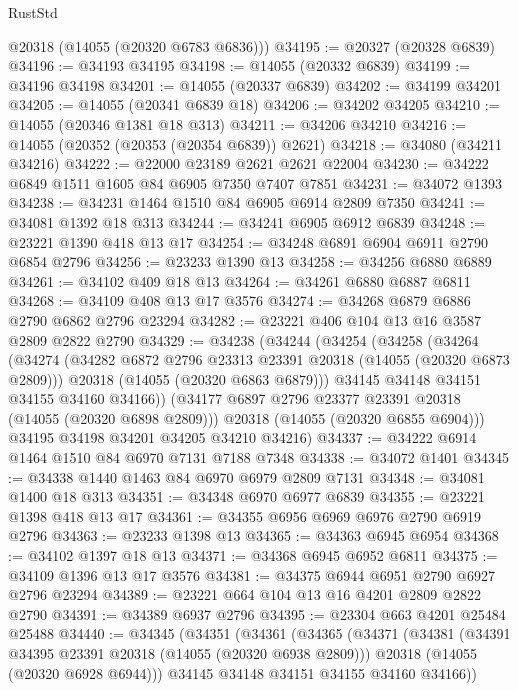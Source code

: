 \begin{lexlean}{RustStd}
\begin{coremodule}
      @20318
      (@14055 (@20320 @6783 @6836)))
@34195 := @20327 (@20328 @6839)
@34196 := @34193 @34195
@34198 := @14055 (@20332 @6839)
@34199 := @34196 @34198
@34201 := @14055 (@20337 @6839)
@34202 := @34199 @34201
@34205 := @14055 (@20341 @6839 @18)
@34206 := @34202 @34205
@34210 := @14055 (@20346 @1381 @18 @313)
@34211 := @34206 @34210
@34216 := @14055 (@20352 (@20353 (@20354 @6839)) @2621)
@34218 := @34080 (@34211 @34216)
@34222 := @22000 @23189 @2621 @2621 @22004
@34230 := @34222 @6849 @1511 @1605 @84 @6905 @7350 @7407 @7851
@34231 := @34072 @1393
@34238 := @34231 @1464 @1510 @84 @6905 @6914 @2809 @7350
@34241 := @34081 @1392 @18 @313
@34244 := @34241 @6905 @6912 @6839
@34248 := @23221 @1390 @418 @13 @17
@34254 := @34248 @6891 @6904 @6911 @2790 @6854 @2796
@34256 := @23233 @1390 @13
@34258 := @34256 @6880 @6889
@34261 := @34102 @409 @18 @13
@34264 := @34261 @6880 @6887 @6811
@34268 := @34109 @408 @13 @17 @3576
@34274 := @34268 @6879 @6886 @2790 @6862 @2796 @23294
@34282 := @23221 @406 @104 @13 @16 @3587 @2809 @2822 @2790
@34329 := @34238
    (@34244
      (@34254
        (@34258
          (@34264
            (@34274
              (@34282 @6872 @2796 @23313 @23391 @20318 (@14055 (@20320 @6873 @2809)))
              @20318
              (@14055 (@20320 @6863 @6879)))
            @34145
            @34148
            @34151
            @34155
            @34160
            @34166))
        (@34177 @6897 @2796 @23377 @23391 @20318 (@14055 (@20320 @6898 @2809)))
        @20318
        (@14055 (@20320 @6855 @6904)))
      @34195
      @34198
      @34201
      @34205
      @34210
      @34216)
@34337 := @34222 @6914 @1464 @1510 @84 @6970 @7131 @7188 @7348
@34338 := @34072 @1401
@34345 := @34338 @1440 @1463 @84 @6970 @6979 @2809 @7131
@34348 := @34081 @1400 @18 @313
@34351 := @34348 @6970 @6977 @6839
@34355 := @23221 @1398 @418 @13 @17
@34361 := @34355 @6956 @6969 @6976 @2790 @6919 @2796
@34363 := @23233 @1398 @13
@34365 := @34363 @6945 @6954
@34368 := @34102 @1397 @18 @13
@34371 := @34368 @6945 @6952 @6811
@34375 := @34109 @1396 @13 @17 @3576
@34381 := @34375 @6944 @6951 @2790 @6927 @2796 @23294
@34389 := @23221 @664 @104 @13 @16 @4201 @2809 @2822 @2790
@34391 := @34389 @6937 @2796
@34395 := @23304 @663 @4201 @25484 @25488
@34440 := @34345
    (@34351
      (@34361
        (@34365
          (@34371
            (@34381
              (@34391 @34395 @23391 @20318 (@14055 (@20320 @6938 @2809)))
              @20318
              (@14055 (@20320 @6928 @6944)))
            @34145
            @34148
            @34151
            @34155
            @34160
            @34166))

\end{coremodule}
\end{lexlean}
